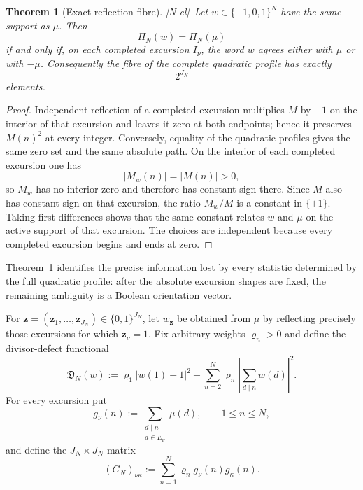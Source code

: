 \documentclass[11pt]{amsart}
\numberwithin{equation}{section}
\theoremstyle{plain}
\newtheorem{theorem}{Theorem}[section]
\theoremstyle{definition}
\theoremstyle{remark}
\newcommand{\tagNE}{\textup{[N-el]}}
\begin{document}
\begin{theorem}[Exact reflection fibre]
\label{thm:exact-reflection-fibre}
\tagNE\ Let $w\in\{-1,0,1\}^N$ have the same support as $\mu$.  Then
\[
\Pi_N(w)=\Pi_N(\mu)
\]
if and only if, on each completed excursion $I_\nu$, the word $w$ agrees either with $\mu$ or with $-\mu$.  Consequently the fibre of the complete quadratic profile has exactly
\[
2^{J_N}
\]
elements.
\end{theorem}

\begin{proof}
Independent reflection of a completed excursion multiplies $M$ by $-1$ on the interior of that excursion and leaves it zero at both endpoints; hence it preserves $M(n)^2$ at every integer.  Conversely, equality of the quadratic profiles gives the same zero set and the same absolute path.  On the interior of each completed excursion one has
\[
|M_w(n)|=|M(n)|>0,
\]
so $M_w$ has no interior zero and therefore has constant sign there.  Since $M$ also has constant sign on that excursion, the ratio $M_w/M$ is a constant in $\{\pm1\}$.  Taking first differences shows that the same constant relates $w$ and $\mu$ on the active support of that excursion.  The choices are independent because every completed excursion begins and ends at zero.
\end{proof}

Theorem~\ref{thm:exact-reflection-fibre} identifies the precise information lost by every statistic determined by the full quadratic profile: after the absolute excursion shapes are fixed, the remaining ambiguity is a Boolean orientation vector.

For $\mathbf z=(\mathbf z_1,\dots,\mathbf z_{J_N})\in\{0,1\}^{J_N}$, let $w_\mathbf z$ be obtained from $\mu$ by reflecting precisely those excursions for which $\mathbf z_\nu=1$.  Fix arbitrary weights $\varrho_n>0$ and define the divisor-defect functional
\begin{equation}
\mathfrak D_N(w)
:=
\varrho_1|w(1)-1|^2
+
\sum_{n=2}^N\varrho_n
\left|\sum_{d\mid n}w(d)\right|^2.
\label{eq:divisor-defect-functional}
\end{equation}
For every excursion put
\begin{equation}
g_\nu(n):=
\sum_{\substack{d\mid n\\ d\in E_\nu}}\mu(d),
\qquad 1\le n\le N,
\label{eq:excursion-divisor-signal-new}
\end{equation}
and define the $J_N\times J_N$ matrix
\begin{equation}
(G_N)_{\nu\kappa}
:=
\sum_{n=1}^N\varrho_n g_\nu(n)g_\kappa(n).
\label{eq:orientation-gram-new}
\end{equation}
\end{document}

